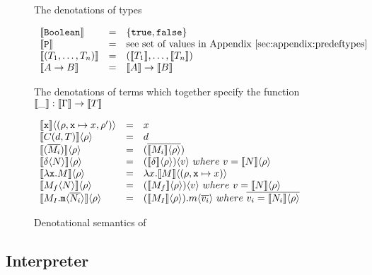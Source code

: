 \begin{figure}[h]
\caption{Denotational semantics of \corelang}
\label{fig:denotations}
The denotations of \corelang types

\begin{center}
  \(\begin{array}{ l c l }
  \Denot{\lst{Boolean}} & = & \{ \lst{true}, \lst{false} \}  \\	
  \Denot{\lst{P}} & = & \text{see set of values in Appendix~\ref{sec:appendix:predeftypes}} \\	
  \Denot{(T_1,\dots,T_n)} & = & (\Denot{T_1},\dots,\Denot{T_n})  \\	
  \Denot{A \to B} & = & \Denot{A} \to \Denot{B}  \\	
  \end{array}\)
\end{center}

The denotations of \corelang terms which together specify the function 
$\llbracket\_\rrbracket: \llbracket\Gamma\rrbracket \to \llbracket T\rrbracket$

\begin{center}
  \(\begin{array}{ l c l }
  \Apply{ \Denot{\lst{x}}			}{(\rho,\lst{x}\mapsto x, \rho')} & = & x \\	
  \Apply{ \Denot{C(d, T)} 			}{\rho} & = & d \\	
  \Apply{ \Denot{(\Ov{M_i})} 		}{\rho} & = & (\Ov{ \Apply{\Denot{M_i}}{\rho} }) \\	

  \Apply{ \Denot{\Apply{\delta}{N}} }{\rho} & = 
		& \Apply{ (\Apply{\Denot{\delta}}{\rho}) }{ v }~where~v = \Apply{\Denot{N}}{\rho} \\	

  \Apply{ \Denot{\Lam{\lst{x}}{M}}	}{\rho} & = 
		& \Lam{x}{ \Apply{\Denot{M}}{(\rho, \lst{x}\mapsto x)} } \\	

  \Apply{ \Denot{\Apply{M_f}{N}}	}{\rho} & = 
		& \Apply{ (\Apply{\Denot{M_f}}{\rho}) }{ v }~where~v = \Apply{\Denot{N}}{\rho} \\	

  \Apply{ \Denot{ \Apply{M_I.\lst{m}}{\Ov{N_i}} }	}{\rho} & = 
		& \Apply{ (\Apply{\Denot{M_I}}{\rho}).m }{ \Ov{v_i} }~where~\Ov{v_i = \Apply{\Denot{N_i}}{\rho}} \\	
  \end{array}\)
\end{center}
\end{figure}

\subsection{Interpreter}
\label{sec:evaluation:interpreter}